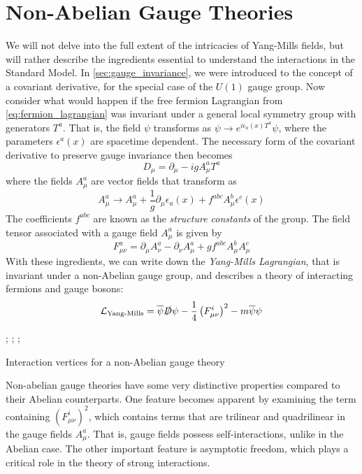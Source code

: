\section{Non-Abelian Gauge Theories}

We will not delve into the full extent of the intricacies of Yang-Mills fields, but will rather describe the ingredients essential to understand the interactions in the Standard Model. In \autoref{sec:gauge_invariance}, we were introduced to the concept of a covariant derivative, for the special case of the $U(1)$ gauge group. Now consider what would happen if the free fermion Lagrangian from \autoref{eq:fermion_lagrangian} was invariant under a general local symmetry group with generators $T^a$. That is, the field $\psi$ transforms as $\psi\rightarrow e^{i\epsilon_a(x) T^a}\psi$, where the parameters $\epsilon^a(x)$ are spacetime dependent. The necessary form of the covariant derivative to preserve gauge invariance then becomes 
$$D_\mu = \partial_\mu - igA_\mu^aT^a$$
where the fields $A_\mu^a$ are vector fields that transform as 
$$A_\mu^a\rightarrow A_\mu^a + \frac{1}{g}\partial_\mu\epsilon_a(x) + f^{abc}A_\mu^b\epsilon^c(x)$$ 
The coefficients $f^{abc}$ are known as the \emph{structure constants} of the group.
The field tensor associated with a gauge field $A_\mu^a$ is given by
$$F_{\mu\nu}^a = \partial_\mu A_\nu^a - \partial_\nu A_\mu^a + gf^{abc}A_\mu^b A_\mu^c$$
With these ingredients, we can write down the \emph{Yang-Mills Lagrangian}, that is invariant under a non-Abelian gauge group, and describes a theory of interacting fermions and gauge bosons:
$$\mathcal{L}_\text{Yang-Mills} = \bar{\psi}\slashed{D}\psi - \frac{1}{4}\left(F_{\mu\nu}^i\right)^2 - m\bar{\psi}\psi$$
\begin{marginfigure}
;
\vskip 1cm
;
\vskip 1cm
;
\caption{Interaction vertices for a non-Abelian gauge theory}
\end{marginfigure}
Non-abelian gauge theories have some very distinctive properties compared to their Abelian counterparts. One feature becomes apparent by examining the term containing $(F_{\mu\nu}^i)^2$, which contains terms that are trilinear and quadrilinear in the gauge fields $A_\mu^a$. That is, gauge fields possess self-interactions, unlike in the Abelian case. The other important feature is asymptotic freedom, which plays a critical role in the theory of strong interactions. 

